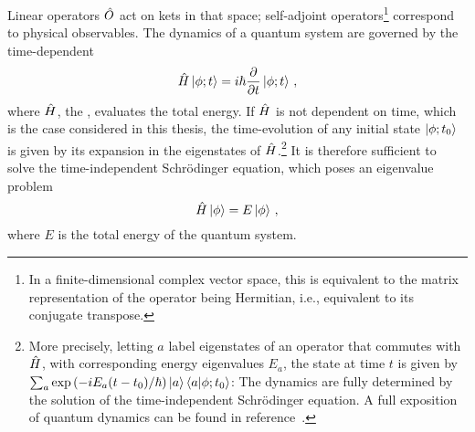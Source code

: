 Linear operators $\hat O$ act on kets in that space; self-adjoint operators\footnote{In a finite-dimensional complex vector space, this is equivalent to the matrix representation of the operator being Hermitian, i.e., equivalent to its conjugate transpose.} correspond to physical observables. The dynamics of a quantum system are governed by the time-dependent 
\begin{equation}
	\hat H \ket{\phi;t} = i \hbar \frac{\partial}{\partial t} \ket{\phi;t} \, , 
\end{equation}
where $\hat H$, the , evaluates the total energy.
If $\hat H$ is not dependent on time, which is the case considered in this thesis, the time-evolution of any initial state $\ket{\phi;t_0}$ is given by its expansion in the eigenstates of $\hat H$.\footnote[][-2\baselineskip]{More precisely, letting $a$ label eigenstates of an operator that commutes with $\hat H$, with corresponding energy eigenvalues $E_a$, the state at time $t$ is given by $\sum_a\nolimits \exp{(-i E_a (t-t_0)/\hbar)} \ket{a} \braket{a | \phi;t_0}$: The dynamics are fully determined by the solution of the time-independent Schrödinger equation. A full exposition of quantum dynamics can be found in reference~\cite[ch.~2]{sakurai2011}.}
It is therefore sufficient to solve the time-independent Schrödinger equation, which poses an eigenvalue problem
\begin{equation}
	\hat H \ket{\phi} = E \ket{\phi} \, ,
\end{equation}
where $E$ is the total energy of the quantum system.


